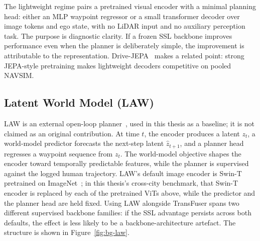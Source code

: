 The lightweight regime pairs a pretrained visual encoder with a minimal planning head: either an MLP waypoint regressor or a small transformer decoder over image tokens and ego state, with no LiDAR input and no auxiliary perception task. The purpose is diagnostic clarity. If a frozen SSL backbone improves performance even when the planner is deliberately simple, the improvement is attributable to the representation. Drive-JEPA~\cite{wang-drive-jepa} makes a related point: strong JEPA-style pretraining makes lightweight decoders competitive on pooled NAVSIM.

\subsection{Latent World Model (LAW)}
\label{sec:bg-law}

LAW is an external open-loop planner~\cite{li-law-2024}, used in this thesis as a baseline; it is not claimed as an original contribution. At time $t$, the encoder produces a latent $z_t$, a world-model predictor forecasts the next-step latent $\hat{z}_{t+1}$, and a planner head regresses a waypoint sequence from $z_t$. The world-model objective shapes the encoder toward temporally predictable features, while the planner is supervised against the logged human trajectory. LAW's default image encoder is Swin-T pretrained on ImageNet~\cite{liu-swin-2021}; in this thesis's cross-city benchmark, that Swin-T encoder is replaced by each of the pretrained ViTs above, while the predictor and the planner head are held fixed. Using LAW alongside TransFuser spans two different supervised backbone families: if the SSL advantage persists across both defaults, the effect is less likely to be a backbone-architecture artefact. The structure is shown in Figure~\ref{fig:bg-law}.

